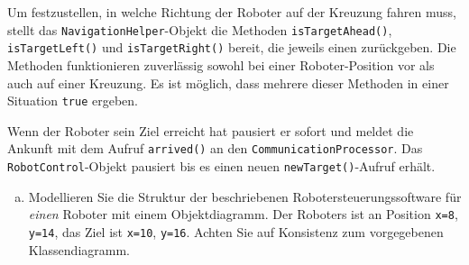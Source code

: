 Um festzustellen, in welche Richtung der Roboter auf der Kreuzung fahren muss, stellt das \texttt{NavigationHelper}-Objekt die Methoden \texttt{isTargetAhead()}, \texttt{isTargetLeft()} und \texttt{isTargetRight()} bereit, die jeweils einen  zurückgeben. Die Methoden funktionieren zuverlässig sowohl bei einer Roboter-Position vor als auch auf einer Kreuzung. Es ist möglich, dass mehrere dieser Methoden in einer Situation \texttt{true} ergeben.

Wenn der Roboter sein Ziel erreicht hat pausiert er sofort und meldet die Ankunft mit dem Aufruf \texttt{arrived()} an den \texttt{CommunicationProcessor}.
Das \texttt{RobotControl}-Objekt pausiert bis es einen neuen \texttt{newTarget()}-Aufruf erhält.






\begin{enumerate}[a) ]
	\item Modellieren Sie die Struktur der beschriebenen Robotersteuerungssoftware für \textit{einen} Roboter mit einem Objektdiagramm. Der Roboters ist an Position \texttt{x=8}, \texttt{y=14}, das Ziel ist \texttt{x=10}, \texttt{y=16}.
	Achten Sie auf Konsistenz zum vorgegebenen Klassendiagramm. 
\end{enumerate}


\solution{\newpage}















